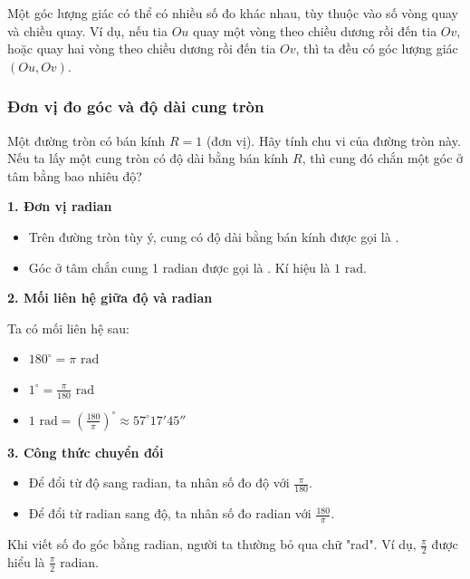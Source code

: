 \begin{emcobiet}
Một góc lượng giác có thể có nhiều số đo khác nhau, tùy thuộc vào số vòng quay và chiều quay. Ví dụ, nếu tia $Ou$ quay một vòng theo chiều dương rồi đến tia $Ov$, hoặc quay hai vòng theo chiều dương rồi đến tia $Ov$, thì ta đều có góc lượng giác $(Ou, Ov)$.
\end{emcobiet}
\subsubsection{Đơn vị đo góc và độ dài cung tròn}

\begin{hoatdong}
Một đường tròn có bán kính $R=1$ (đơn vị). Hãy tính chu vi của đường tròn này. Nếu ta lấy một cung tròn có độ dài bằng bán kính $R$, thì cung đó chắn một góc ở tâm bằng bao nhiêu độ?
\end{hoatdong}

\begin{kienthuc}
\textbf{1. Đơn vị radian}

\begin{itemize}
    \item Trên đường tròn tùy ý, cung có độ dài bằng bán kính được gọi là .
    \item Góc ở tâm chắn cung 1 radian được gọi là . Kí hiệu là $1 \text{ rad}$.
\end{itemize}

\textbf{2. Mối liên hệ giữa độ và radian}

Ta có mối liên hệ sau:
\begin{itemize}
    \item $180^\circ = \pi \text{ rad}$
    \item $1^\circ = \frac{\pi}{180} \text{ rad}$
    \item $1 \text{ rad} = \left(\frac{180}{\pi}\right)^\circ \approx 57^\circ 17'45''$
\end{itemize}

\textbf{3. Công thức chuyển đổi}
\begin{itemize}
    \item Để đổi từ độ sang radian, ta nhân số đo độ với $\frac{\pi}{180}$.
    \item Để đổi từ radian sang độ, ta nhân số đo radian với $\frac{180}{\pi}$.
\end{itemize}
\end{kienthuc}

\begin{emcobiet}
Khi viết số đo góc bằng radian, người ta thường bỏ qua chữ "rad". Ví dụ, $\frac{\pi}{2}$ được hiểu là $\frac{\pi}{2}$ radian.
\end{emcobiet}

